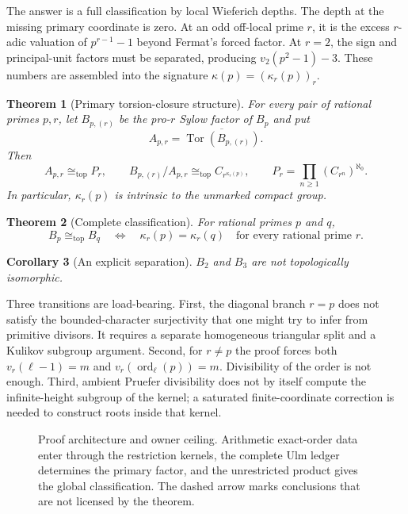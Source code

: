 \documentclass[11pt]{article}
\newtheorem{theorem}{Theorem}[section]
\newtheorem{corollary}[theorem]{Corollary}
\theoremstyle{definition}
\newcommand{\TopIso}{\cong_{\mathrm{top}}}
\DeclareMathOperator{\Tor}{Tor}
\DeclareMathOperator{\ord}{ord}
\begin{document}
The answer is a full classification by local Wieferich depths.  The depth at
the missing primary coordinate is zero.  At an odd off-local prime $r$, it is
the excess $r$-adic valuation of $p^{r-1}-1$ beyond Fermat's forced factor.
At $r=2$, the sign and principal-unit factors must be separated, producing
$v_2(p^2-1)-3$.  These numbers are assembled into the signature
$\kappa(p)=(\kappa_r(p))_r$.

\begin{theorem}[Primary torsion-closure structure]\label{thm:primary-structure}
For every pair of rational primes $p,r$, let $B_{p,(r)}$ be the pro-$r$
Sylow factor of $B_p$ and put
\[
 A_{p,r}=\overline{\Tor(B_{p,(r)})}.
\]
Then
\begin{equation}\label{eq:factor-type}
 A_{p,r}\TopIso P_r,
 \qquad
 B_{p,(r)}/A_{p,r}\TopIso C_{r^{\kappa_r(p)}},
 \qquad
 P_r=\prod_{n\ge1}(C_{r^n})^{\aleph_0}.
\end{equation}
In particular, $\kappa_r(p)$ is intrinsic to the unmarked compact group.
\end{theorem}

\begin{theorem}[Complete classification]\label{thm:classification}
For rational primes $p$ and $q$,
\begin{equation}\label{eq:classification}
 B_p\TopIso B_q
 \quad\Longleftrightarrow\quad
 \kappa_r(p)=\kappa_r(q)
 \quad\text{for every rational prime }r.
\end{equation}
\end{theorem}

\begin{corollary}[An explicit separation]\label{cor:b2b3}
$B_2$ and $B_3$ are not topologically isomorphic.
\end{corollary}

Three transitions are load-bearing.  First, the diagonal branch $r=p$ does
not satisfy the bounded-character surjectivity that one might try to infer
from primitive divisors.  It requires a separate homogeneous triangular
split and a Kulikov subgroup argument.  Second, for $r\ne p$ the proof forces
both $v_r(\ell-1)=m$ and $v_r(\ord_\ell(p))=m$.  Divisibility of the order is
not enough.  Third, ambient Pruefer divisibility does not by itself compute
the infinite-height subgroup of the kernel; a saturated finite-coordinate
correction is needed to construct roots inside that kernel.

\begin{figure}[htbp]
\centering
\resizebox{\linewidth}{!}{}
\caption{Proof architecture and owner ceiling.  Arithmetic exact-order data
enter through the restriction kernels, the complete Ulm ledger determines the
primary factor, and the unrestricted product gives the global classification.
The dashed arrow marks conclusions that are not licensed by the theorem.}
\label{fig:architecture}
\end{figure}
\end{document}
